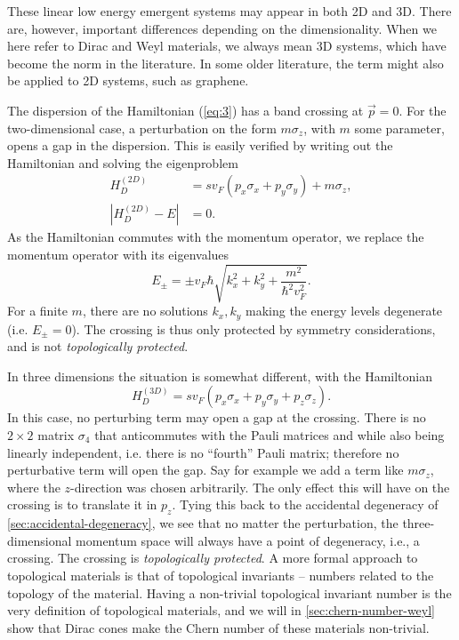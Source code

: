 These linear low energy emergent systems may appear in both 2D and 3D.
There are, however, important differences depending on the dimensionality.
When we here refer to Dirac and Weyl materials, we always mean 3D systems, which have become the norm in the literature.
In some older literature, the term might also be applied to 2D systems, such as graphene.

\label{sec:stability-of-gap}
The dispersion of the Hamiltonian (\ref{eq:3}) has a band crossing at  $\vec{p} = 0$.
For the two-dimensional case, a perturbation on the form $m \sigma_z$, with $m$ some parameter, opens a gap in the dispersion.
This is easily verified by writing out the Hamiltonian and solving the eigenproblem
\begin{align}
  H_D^{(2D)} &= s v_{F} (p_x \sigma_x + p_y \sigma_y) + m \sigma_z,\\
  \left|
  H_D^{(2D)} - E
  \right| &= 0.
\end{align}
As the Hamiltonian commutes with the momentum operator, we replace the momentum operator with its eigenvalues
\begin{equation}
E_{\pm} = \pm v_F \hbar \sqrt{k_x^2 + k_y^2 + \frac{m^2}{\hbar ^2 v_{F}^2}}.
\end{equation}
For a finite \( m \), there are no solutions $k_x, k_y$ making the energy levels degenerate (i.e. \( E_{\pm} = 0 \)).
The crossing is thus only protected by symmetry considerations, and is not \emph{topologically protected}.


In three dimensions the situation is somewhat different, with the Hamiltonian  
\begin{equation}
  H_D^{(3D)} = s v_F ( p_x \sigma_x + p_y \sigma_y + p_z \sigma_z).
\end{equation}
In this case, no perturbing term may open a gap at the crossing.
There is no $2\times 2$ matrix $\sigma_4$ that anticommutes with the Pauli matrices and while also being linearly independent, i.e. there is no ``fourth'' Pauli matrix;
therefore no perturbative term will open the gap.
Say for example we add a term like $m \sigma_z$, where the $z$-direction was chosen arbitrarily.
The only effect this will have on the crossing is to translate it in $p_z$.
Tying this back to the accidental degeneracy of \cref{sec:accidental-degeneracy}, we see that no matter the perturbation, the three-dimensional momentum space will always have a point of degeneracy, i.e., a crossing.
The crossing is \emph{topologically protected}.
A more formal approach to topological materials is that of topological invariants -- numbers related to the topology of the material.
Having a non-trivial topological invariant number is the very definition of topological materials, and we will in \cref{sec:chern-number-weyl} show that Dirac cones make the Chern number of these materials non-trivial.

